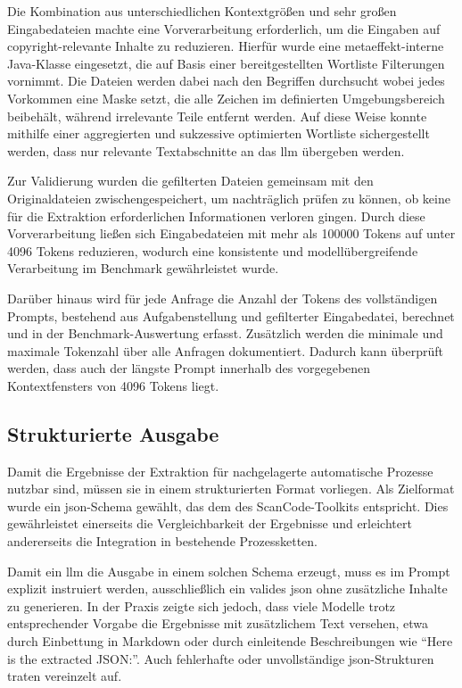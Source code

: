 Die Kombination aus unterschiedlichen Kontextgrößen und sehr großen Eingabedateien machte eine Vorverarbeitung erforderlich, um die Eingaben auf copyright-relevante Inhalte zu reduzieren.
Hierfür wurde eine metaeffekt-interne Java-Klasse eingesetzt, die auf Basis einer bereitgestellten Wortliste Filterungen vornimmt.
Die Dateien werden dabei nach den Begriffen durchsucht wobei jedes Vorkommen eine Maske setzt, die alle Zeichen im definierten Umgebungsbereich beibehält, während irrelevante Teile entfernt werden.
Auf diese Weise konnte mithilfe einer aggregierten und sukzessive optimierten Wortliste sichergestellt werden, dass nur relevante Textabschnitte an das \gls{llm} übergeben werden.

Zur Validierung wurden die gefilterten Dateien gemeinsam mit den Originaldateien zwischengespeichert, um nachträglich prüfen zu können, ob keine für die Extraktion erforderlichen Informationen verloren gingen.
Durch diese Vorverarbeitung ließen sich Eingabedateien mit mehr als \num{100000} Tokens auf unter \num{4096} Tokens reduzieren, wodurch eine konsistente und modellübergreifende Verarbeitung im Benchmark gewährleistet wurde.

Darüber hinaus wird für jede Anfrage die Anzahl der Tokens des vollständigen Prompts, bestehend aus Aufgabenstellung und gefilterter Eingabedatei, berechnet und in der Benchmark-Auswertung erfasst.
Zusätzlich werden die minimale und maximale Tokenzahl über alle Anfragen dokumentiert.
Dadurch kann überprüft werden, dass auch der längste Prompt innerhalb des vorgegebenen Kontextfensters von \num{4096} Tokens liegt.


\subsection{Strukturierte Ausgabe}\label{subsec:strukturierte-ausgabe}

Damit die Ergebnisse der Extraktion für nachgelagerte automatische Prozesse nutzbar sind, müssen sie in einem strukturierten Format vorliegen.
Als Zielformat wurde ein \gls{json}-Schema gewählt, das dem des ScanCode-Toolkits entspricht.
Dies gewährleistet einerseits die Vergleichbarkeit der Ergebnisse und erleichtert andererseits die Integration in bestehende Prozessketten.

Damit ein \gls{llm} die Ausgabe in einem solchen Schema erzeugt, muss es im Prompt explizit instruiert werden, ausschließlich ein valides \gls{json} ohne zusätzliche Inhalte zu generieren.
In der Praxis zeigte sich jedoch, dass viele Modelle trotz entsprechender Vorgabe die Ergebnisse mit zusätzlichem Text versehen, etwa durch Einbettung in Markdown oder durch einleitende Beschreibungen wie \enquote{Here is the extracted JSON:}.
Auch fehlerhafte oder unvollständige \gls{json}-Strukturen traten vereinzelt auf.

